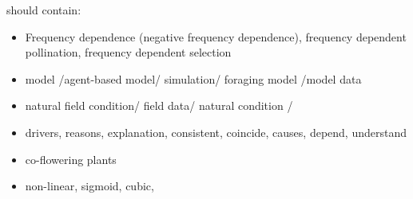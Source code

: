 \documentclass{article}
\begin{document}
should contain:
\begin{itemize}
\item Frequency dependence (negative frequency dependence), frequency dependent pollination, frequency dependent selection
\item model /agent-based model/ simulation/ foraging model /model data
\item natural field condition/ field data/ natural condition / 
\\
\item drivers, reasons, explanation, consistent, coincide, causes, depend, understand
\item co-flowering plants
\item non-linear, sigmoid, cubic, 

\end{itemize}
\end{document}
